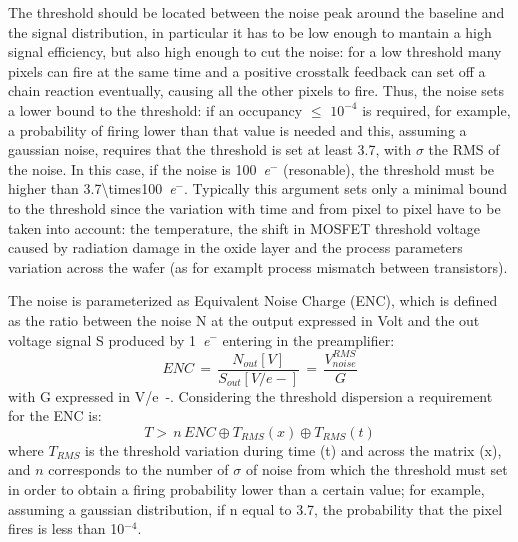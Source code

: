         The threshold should be located between the noise peak around the baseline and the signal distribution, in particular it has to be low enough to mantain a high signal efficiency, but also high enough to cut the noise: for a low threshold many pixels can fire at the same time and a positive crosstalk feedback can set off a chain reaction eventually, causing all the other pixels to fire.
        Thus, the noise sets a lower bound to the threshold: if an occupancy $\leqslant$ $10^{-4}$ is required, for example, a probability of firing lower than that value is needed and this, assuming a gaussian noise, requires that the threshold is set at least \SI{3.7}{\sigma}, with $\sigma$ the RMS of the noise.   
        In this case, if the noise is \SI{100}{\elementarycharge}$^-$ (resonable), the threshold must be higher than \SI[parse-numbers=false]{3.7\times100}{\elementarycharge}$^-$.
        Typically this argument sets only a minimal bound to the threshold since the variation with time and from pixel to pixel have to be taken into account: the temperature, the shift in MOSFET threshold voltage caused by radiation damage in the oxide layer and the process parameters variation across the wafer (as for examplt process mismatch between transistors).
            
        The noise is parameterized as Equivalent Noise Charge (ENC), which is defined as the ratio between the noise N at the output expressed in Volt and the out voltage signal S produced by \SI{1}{\elementarycharge}$^-$ entering in the preamplifier:
        \begin{equation}
            ENC\, =\, \frac{N_{out}[V]}{S_{out}[V/e-]}\,=\,\frac{V^{RMS} _{noise}}{G}
        \end{equation} 
        with G expressed in \si{V/e-}.
        Considering the threshold dispersion a requirement for the ENC is: 
        \begin{equation}
            T >\, n\,ENC \oplus T_{RMS}(x) \oplus T_{RMS}(t)
        \end{equation}
        where $T_{RMS}$ is the threshold variation during time (t) and across the matrix (x), and $n$ corresponds to the number of $\sigma$ of noise from which the threshold must set in order to obtain a firing probability lower than a certain value; for example, assuming a gaussian distribution, if n equal to 3.7, the probability that the pixel fires is less than 10$^{-4}$.

